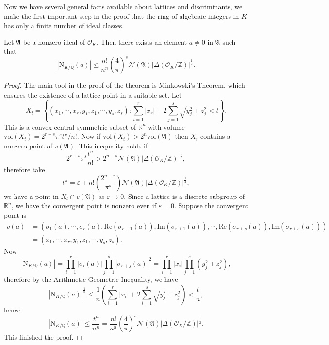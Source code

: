 Now we have several general facts available about lattices and discriminants, we make the first important step in the proof that the ring of algebraic integers in $K$ has only a finite number of ideal classes.
\begin{theorem}\label{MinBoundLem}
Let $\mathfrak{A}$ be a nonzero ideal of $\mathcal{O}_K$. Then there exists an element $a\ne 0$ in $\mathfrak{A}$ such that 
$$
\left| \mathrm{N}_{K/\mathbb{Q}}\left( a \right) \right|\le \frac{n!}{n^n}\left( \frac{4}{\pi} \right) ^s\mathcal{N} \left( \mathfrak{A} \right) \left| \Delta \left( \mathcal{O} _K/\mathbb{Z} \right) \right|^{\frac{1}{2}}.
$$
\end{theorem}
\begin{proof}
The main tool in the proof of the theorem is Minkowski's Theorem, which ensures the existence of a lattice point in a suitable set. Let 
$$
X_t=\left\{ \left( x_1,\cdots ,x_r,y_1,z_1,\cdots ,y_s,z_s \right) :\sum_{i=1}^r{\left| x_r \right|}+2\sum_{j=1}^s{\sqrt{y_{j}^{2}+z_{j}^{2}}}<t \right\} .
$$
This is a convex central symmetric subset of $\mathbb{R}^n$ with volume $\mathrm{vol}\left( X_t \right) =2^{r-s}\pi ^st^n/n!$. Now if $\mathrm{vol}(X_t)>2^n\mathrm{vol}(\mathfrak{A})$ then $X_t$ contains a nonzero point of $v(\mathfrak{A})$. This inequality holds if 
$$
2^{r-s}\pi ^s\frac{t^n}{n!}>2^{n-s}\mathcal{N} \left( \mathfrak{A} \right) \left| \Delta \left( \mathcal{O} _K/\mathbb{Z} \right) \right|^{\frac{1}{2}},
$$
therefore take 
$$
t^n=\varepsilon +n!\left( \frac{2^{n-r}}{\pi ^s} \right) \mathcal{N} \left( \mathfrak{A} \right) \left| \Delta \left( \mathcal{O} _K/\mathbb{Z} \right) \right|^{\frac{1}{2}},
$$
we have a point in $X_t\cap v(\mathfrak{A})$ as $\varepsilon\to 0$. Since a lattice is a discrete subgroup of $\mathbb{R}^n$, we have the convergent point is nonzero even if $\varepsilon=0$. Suppose the convergent point is 
$$
\begin{aligned}
v\left( a \right) &=\left( \sigma _1\left( a \right) ,\cdots ,\sigma _r\left( a \right) ,\mathrm{Re}\left( \sigma _{r+1}\left( a \right) \right) ,\mathrm{Im}\left( \sigma _{r+1}\left( a \right) \right) ,\cdots ,\mathrm{Re}\left( \sigma _{r+s}\left( a \right) \right) ,\mathrm{Im}\left( \sigma _{r+s}\left( a \right) \right) \right) 
\\
&=\left( x_1,\cdots ,x_r,y_1,z_1,\cdots ,y_s,z_s \right) .
\end{aligned}
$$
Now 
$$
\left| \mathrm{N}_{K/\mathbb{Q}}\left( a \right) \right|=\prod_{i=1}^r{\left| \sigma _i\left( a \right) \right|}\prod_{j=1}^s{\left| \sigma _{r+j}\left( a \right) \right|^2}=\prod_{i=1}^r{\left| x_i \right|}\prod_{j=1}^s{\left( y_{j}^{2}+z_{j}^{2} \right)},
$$
therefore by the Arithmetic-Geometric Inequality, we have 
$$
\left| \mathrm{N}_{K/\mathbb{Q}}\left( a \right) \right|^{\frac{1}{n}}\le \frac{1}{n}\left( \sum_{i=1}^r{\left| x_i \right|}+2\sum_{i=1}^s{\sqrt{y_{j}^{2}+z_{j}^{2}}} \right) <\frac{t}{n},
$$
hence 
$$
\left| \mathrm{N}_{K/\mathbb{Q}}\left( a \right) \right|\le \frac{t^n}{n^n}=\frac{n!}{n^n}\left( \frac{4}{\pi} \right) ^s\mathcal{N} \left( \mathfrak{A} \right) \left| \Delta \left( \mathcal{O} _K/\mathbb{Z} \right) \right|^{\frac{1}{2}}.
$$
This finished the proof.
\end{proof}
